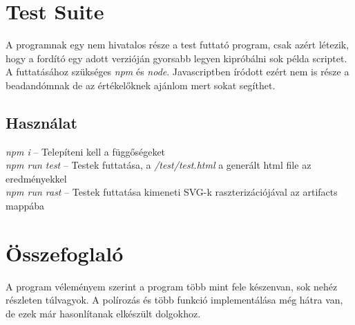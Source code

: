 \documentclass{article}[12pt,a4paper]
\begin{document}
    \section{Test Suite}
    A programnak egy nem hivatalos része a test futtató program, csak azért létezik, hogy a fordító egy adott verzióján gyorsabb legyen kipróbálni sok példa scriptet.
    A futtatásához szükséges \textit{npm} és \textit{node}.
    Javascriptben íródott ezért nem is része a beadandómnak de az értékelőknek ajánlom mert sokat segíthet.

    \subsection{Használat}
    \textit{npm i} -- Telepíteni kell a függőségeket\\
    \textit{npm run test} -- Testek futtatása, a \textit{/test/test.html} a generált html file az eredményekkel\\
    \textit{npm run rast} -- Testek futtatása kimeneti SVG-k raszterizációjával az artifacts mappába

    \section{Összefoglaló}
    A program véleményem szerint a program több mint fele készenvan, sok nehéz részleten túlvagyok.
    A polírozás és több funkció implementálása még hátra van, de ezek már hasonlítanak elkészült dolgokhoz.
\end{document}
